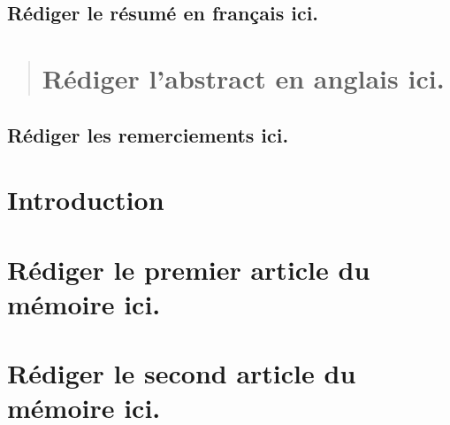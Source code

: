\documentclass[12pt]{ulaval}
\date{August 2020}
\begin{document}
  \maketitle

\frontmatter %
\pagestyle{plain} %
\setcounter{page}{2}
  \begin{resume}
    \chapter{Rédiger le résumé en français
    ici.}\label{rediger-le-resume-en-francais-ici.}
  \end{resume}
  \begin{abstract}
    \chapter{Rédiger l'abstract en anglais
    ici.}\label{rediger-labstract-en-anglais-ici.}
  \end{abstract}

  \hypersetup{linkcolor=black}
  \tableofcontents

  \listoftables

  \listoffigures
  \begin{remerciements}
    \chapter{Rédiger les remerciements
    ici.}\label{rediger-les-remerciements-ici.}
  \end{remerciements}
% 
\mainmatter %
\pagestyle{fancyplain} %

\doublespace

\chapter*{Introduction}\label{introduction}

\chapter{Rédiger le premier article du mémoire
ici.}\label{rediger-le-premier-article-du-memoire-ici.}

\chapter{Rédiger le second article du mémoire
ici.}\label{rediger-le-second-article-du-memoire-ici.}
\end{document}
